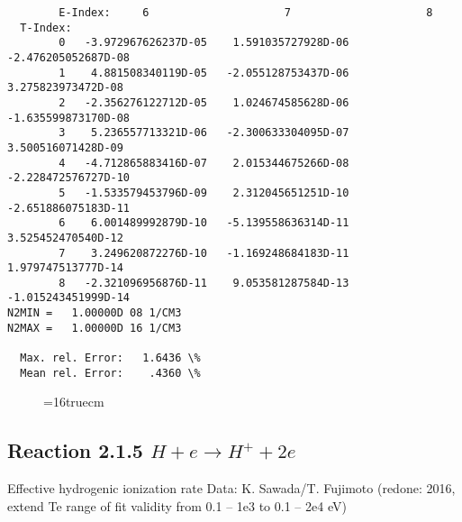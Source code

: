 \documentclass[12pt,dvipdfmx]{article}
\begin{document}
\begin{small}
\begin{verbatim}
        E-Index:     6                     7                     8
  T-Index:
        0   -3.972967626237D-05    1.591035727928D-06   -2.476205052687D-08
        1    4.881508340119D-05   -2.055128753437D-06    3.275823973472D-08
        2   -2.356276122712D-05    1.024674585628D-06   -1.635599873170D-08
        3    5.236557713321D-06   -2.300633304095D-07    3.500516071428D-09
        4   -4.712865883416D-07    2.015344675266D-08   -2.228472576727D-10
        5   -1.533579453796D-09    2.312045651251D-10   -2.651886075183D-11
        6    6.001489992879D-10   -5.139558636314D-11    3.525452470540D-12
        7    3.249620872276D-10   -1.169248684183D-11    1.979747513777D-14
        8   -2.321096956876D-11    9.053581287584D-13   -1.015243451999D-14
N2MIN =   1.00000D 08 1/CM3
N2MAX =   1.00000D 16 1/CM3

  Max. rel. Error:   1.6436 \%
  Mean rel. Error:    .4360 \%
\end{verbatim}\end{small}
\begin{figure} \label{2.1.5o}
\epsfxsize=16truecm
\end{figure}
\newpage


\subsection{
Reaction 2.1.5 $H + e \rightarrow H^+ + 2e $ }

   Effective hydrogenic ionization rate    Data: K. Sawada/T. Fujimoto (redone: 2016,
extend Te range of fit validity from 0.1 -- 1e3 to 0.1 -- 2e4 eV)
   \cite{kn:Sawada}
\end{document}
